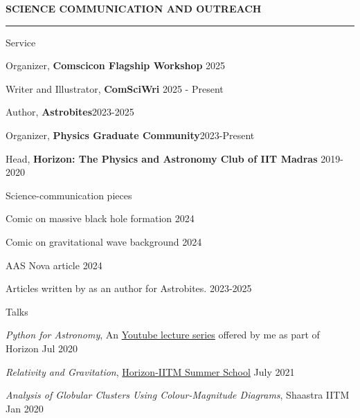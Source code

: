\documentclass{resume} %
\renewenvironment{rSection}[1]{
\sectionskip
\textbf{\textcolor{C2}{\MakeUppercase{#1}}}
\sectionlineskip
\hrule
\begin{list}{}{
\setlength{\leftmargin}{1.5em}
}
\item[]
}{
\end{list}
}
\begin{document}
\begin{rSection}{Science communication and outreach}
    \begin{rSubsection}{Service}{}{}{}
    \item Organizer, {\color{C3} \textbf{Comscicon Flagship Workshop}} \hfill 2025
    \item Writer and Illustrator, {\color{C3} \textbf{ComSciWri}} \hfill 2025 - Present
    \item Author, {\color{C3} \textbf{Astrobites}}\hfill 2023-2025
    \item Organizer, {\color{C3} \textbf{Physics Graduate Community}}\hfill 2023-Present
    \item Head, {\color{C3} \textbf{Horizon: The Physics and Astronomy Club of IIT Madras}} \hfill 2019-2020
    \end{rSubsection}

    \begin{rSubsection}{Science-communication pieces}{}{}{}
    \item Comic on massive black hole formation \hfill 2024
    \item Comic on gravitational wave background \hfill 2024
    \item AAS Nova article \hfill 2024
    \item Articles written by as an author for Astrobites. \hfill 2023-2025
    \end{rSubsection}

    \begin{rSubsection}{Talks}{}{}{}
     \item \textit{\color{C2} Python for Astronomy}, An \href{https://youtu.be/HfYR0uwYAyM}{Youtube lecture series} offered by me as part of Horizon \hfill Jul 2020
    \item \textit{\color{C2} Relativity and Gravitation}, \href{https://github.com/HorizonIITM/summer-school-2021}{Horizon-IITM Summer School} \hfill July 2021
    \item \textit{\color{C2} Analysis of Globular Clusters Using
    Colour-Magnitude Diagrams}, Shaastra IITM \hfill Jan 2020
    \end{rSubsection}
\end{rSection}
\end{document}
